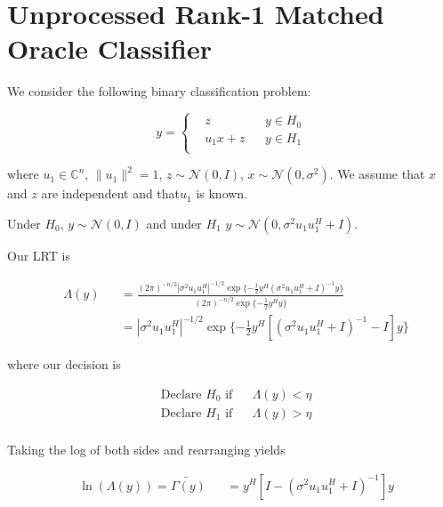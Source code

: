 \documentclass[english]{article}
\begin{document}
\section*{Unprocessed Rank-1 Matched Oracle Classifier}

We consider the following binary classification problem:

\begin{equation}
y=\left\{
\begin{aligned}
&z
&& y\in H_0\\
&u_1x+z
&& y\in H_1\\
\end{aligned}\right.
\end{equation}

where $u_1\in\mathbb{C}^n$, $\|u_1\|^2=1$, $z\sim\mathcal{N}(0,I)$, $x\sim\mathcal{N}(0,\sigma^2)$. We assume that $x$ and $z$ are independent and that$u_1$ is known.

Under $H_0$, $y\sim\mathcal{N}(0,I)$ and under $H_1$ $y\sim\mathcal{N}(0,\sigma^2u_1u_1^H+I)$.

Our LRT is

\begin{equation}
\begin{aligned}
&\Lambda(y)
&&=\frac{\left(2\pi\right)^{-n/2}|\sigma^2u_1u_1^H|^{-1/2}\exp\{-\frac{1}{2}y^H\left(\sigma^2u_1u_1^H+I\right)^{-1}y\}}{\left(2\pi\right)^{-n/2}\exp\{-\frac{1}{2}y^Hy\}}\\
&&&=|\sigma^2u_1u_1^H|^{-1/2}\exp\{-\frac{1}{2}y^H\left[\left(\sigma^2u_1u_1^H+I\right)^{-1}-I\right]y\}
\end{aligned}
\end{equation}

where our decision is

\begin{equation}
\begin{aligned}
&\text{Declare } H_0 \text{ if}
&& \Lambda(y) < \eta\\
& \text{Declare } H_1 \text{ if}
&& \Lambda(y) > \eta\\
\end{aligned}
\end{equation}

Taking the log of both sides and rearranging yields

\begin{equation}
\begin{aligned}
&\ln\left(\Lambda(y)\right)=\tilde{\Gamma(y)}
&&=y^H\left[I-\left(\sigma^2u_1u_1^H+I\right)^{-1}\right]y
\end{aligned}
\end{equation}
\end{document}
